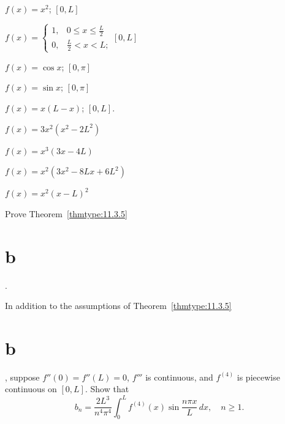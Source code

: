 \begin{exerciselist}
  \item\label{exer:11.3.26} $f(x)=x^{2}$; \quad $[0,L]$

  \item\label{exer:11.3.27} \Cex $f(x)= \left\{
  \begin{array}{cl}
    1, & 0\le x\le\frac{L}{2} \\
    0, & \frac{L}{2}<x<L;
  \end{array}\right.$\quad $[0,L]$

  \item\label{exer:11.3.28} $f(x)=\cos x$; \quad $[0,\pi]$

  \item\label{exer:11.3.29} $f(x)=\sin x$; \quad $[0,\pi]$

  \item\label{exer:11.3.30} \Cex $f(x)=x(L-x)$; \quad $[0,L]$.


  \item\label{exer:11.3.31} $f(x)=3x^{2}(x^{2}-2L^{2})$

  \item\label{exer:11.3.32} $f(x)=x^{3}(3x-4L)$

  \item\label{exer:11.3.33} $f(x)=x^{2}(3x^{2}-8Lx+6L^{2})$

  \item\label{exer:11.3.34} $f(x)=x^{2}(x-L)^{2}$

  \item\label{exer:11.3.35}
  \begin{alist}
    \item %
    Prove Theorem~\ref{thmtype:11.3.5}\part{b}.

    \item %
    In addition to the assumptions of Theorem~\ref{thmtype:11.3.5}\part{b}, suppose
    $f''(0)=f''(L)=0$, $f'''$ is continuous, and $f^{(4)}$ is piecewise continuous on $[0,L]$. Show
    that
    \[
      b_{n}=\frac{2L^{3}}{n^{4}\pi^{4}}\int_{0}^{L}f^{(4)}(x)\sin\frac{n\pi x}{L}\,dx, \quad n\ge1.
    \]
  \end{alist}


\end{exerciselist}
